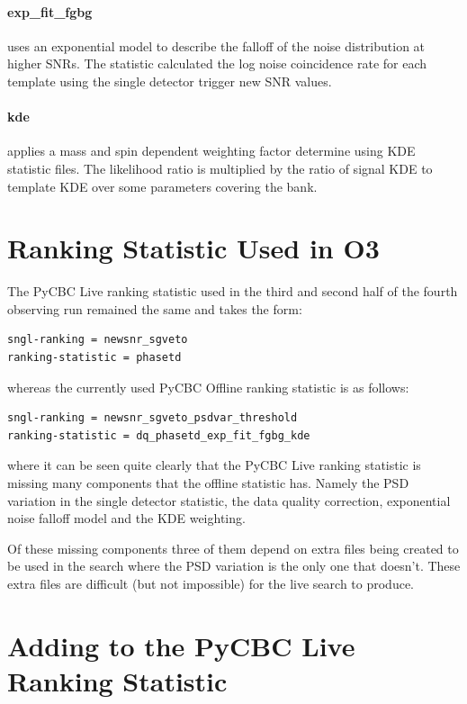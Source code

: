 \paragraph{exp\_fit\_fgbg}
uses an exponential model to describe the falloff of the noise distribution at higher SNRs. The statistic calculated the log noise coincidence rate for each template using the single detector trigger new SNR values.

\paragraph{kde}
applies a mass and spin dependent weighting factor determine using KDE statistic files. The likelihood ratio is multiplied by the ratio of signal KDE to template KDE over some parameters covering the bank.

\section{\label{sec:pycbclive-previous-stat}Ranking Statistic Used in O3}

The PyCBC Live ranking statistic used in the third and second half of the fourth observing run remained the same and takes the form:
%
\begin{verbatim}
sngl-ranking = newsnr_sgveto
ranking-statistic = phasetd
\end{verbatim}
%
whereas the currently used PyCBC Offline ranking statistic is as follows:
%
\begin{verbatim}
sngl-ranking = newsnr_sgveto_psdvar_threshold
ranking-statistic = dq_phasetd_exp_fit_fgbg_kde
\end{verbatim}
%
where it can be seen quite clearly that the PyCBC Live ranking statistic is missing many components that the offline statistic has. Namely the PSD variation in the single detector statistic, the data quality correction, exponential noise falloff model and the KDE weighting.

Of these missing components three of them depend on extra files being created to be used in the search where the PSD variation is the only one that doesn't. These extra files are difficult (but not impossible) for the live search to produce.

\section{\label{pycbclive-new-additions}Adding to the PyCBC Live Ranking Statistic}

